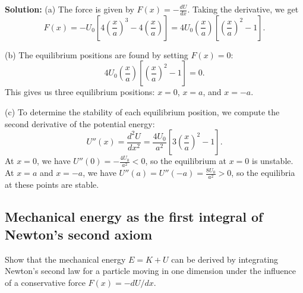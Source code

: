 \documentclass[12pt]{article}
\begin{document}
\textbf{Solution:}
(a) The force is given by $F(x) = -\frac{dU}{dx}$. Taking the derivative, we get
\begin{equation}
    F(x) = -U_0 \left[4\left(\frac{x}{a}\right)^3 - 4\left(\frac{x}{a}\right)\right] = 4U_0\left(\frac{x}{a}\right)\left[\left(\frac{x}{a}\right)^2 - 1\right].
\end{equation}

(b) The equilibrium positions are found by setting $F(x) = 0$:
\begin{equation}
    4U_0\left(\frac{x}{a}\right)\left[\left(\frac{x}{a}\right)^2 - 1\right] = 0.
\end{equation}
This gives us three equilibrium positions: $x = 0$, $x = a$, and $x = -a$.

(c) To determine the stability of each equilibrium position, we compute the second derivative of the potential energy:
\begin{equation}
    U''(x) = \frac{d^2U}{dx^2} = \frac{4U_0}{a^2}\left[3\left(\frac{x}{a}\right)^2 - 1\right].
\end{equation}
At $x = 0$, we have $U''(0) = -\frac{4U_0}{a^2} < 0$, so the equilibrium at $x = 0$ is unstable.
At $x = a$ and $x = -a$, we have $U''(a) = U''(-a) = \frac{8U_0}{a^2} > 0$, so the equilibria at these points are stable.


\subsection{Mechanical energy as the first integral of Newton's second axiom}
Show that the mechanical energy $E = K + U$  can be derived by integrating Newton's second law for a particle moving in one dimension under the influence of a conservative force $F(x)=-dU/dx$.
\end{document}
